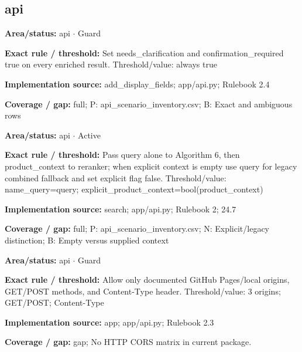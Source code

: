 \subsection*{api}
\begin{tcolorbox}[enhanced,breakable,colback=white,colframe=Muted!45,boxrule=0.45pt,arc=1.5pt,left=6pt,right=6pt,top=5pt,bottom=5pt,title={\texttt{API-CONFIRM-08}},title after break={\texttt{API-CONFIRM-08}\ (continued)},fonttitle=\headingfont\bfseries\color{Navy},coltitle=Navy]
\textbf{Area/status:} api $\boldsymbol{\cdot}$ Guard\par
\smallskip
\textbf{Exact rule / threshold:} Set needs\_\allowbreak{}clarification and confirmation\_\allowbreak{}required true on every enriched result. Threshold/\allowbreak{}value: always true\par
\smallskip
\textbf{Implementation source:} add\_\allowbreak{}display\_\allowbreak{}fields; app/\allowbreak{}api.py; Rulebook 2.4\par
\smallskip
\textbf{Coverage / gap:} full; P: api\_\allowbreak{}scenario\_\allowbreak{}inventory.csv; B: Exact and ambiguous rows
\end{tcolorbox}
\begin{tcolorbox}[enhanced,breakable,colback=white,colframe=Muted!45,boxrule=0.45pt,arc=1.5pt,left=6pt,right=6pt,top=5pt,bottom=5pt,title={\texttt{API-CONTEXT-BOUNDARY-03}},title after break={\texttt{API-CONTEXT-BOUNDARY-03}\ (continued)},fonttitle=\headingfont\bfseries\color{Navy},coltitle=Navy]
\textbf{Area/status:} api $\boldsymbol{\cdot}$ Active\par
\smallskip
\textbf{Exact rule / threshold:} Pass query alone to Algorithm 6, then product\_\allowbreak{}context to reranker; when explicit context is empty use query for legacy combined fallback and set explicit flag false. Threshold/\allowbreak{}value: name\_\allowbreak{}query=query; explicit\_\allowbreak{}product\_\allowbreak{}context=bool(product\_\allowbreak{}context)\par
\smallskip
\textbf{Implementation source:} search; app/\allowbreak{}api.py; Rulebook 2; 24.7\par
\smallskip
\textbf{Coverage / gap:} full; P: api\_\allowbreak{}scenario\_\allowbreak{}inventory.csv; N: Explicit/\allowbreak{}legacy distinction; B: Empty versus supplied context
\end{tcolorbox}
\begin{tcolorbox}[enhanced,breakable,colback=white,colframe=Muted!45,boxrule=0.45pt,arc=1.5pt,left=6pt,right=6pt,top=5pt,bottom=5pt,title={\texttt{API-CORS-09}},title after break={\texttt{API-CORS-09}\ (continued)},fonttitle=\headingfont\bfseries\color{Navy},coltitle=Navy]
\textbf{Area/status:} api $\boldsymbol{\cdot}$ Guard\par
\smallskip
\textbf{Exact rule / threshold:} Allow only documented GitHub Pages/\allowbreak{}local origins, GET/\allowbreak{}POST methods, and Content-Type header. Threshold/\allowbreak{}value: 3 origins; GET/\allowbreak{}POST; Content-Type\par
\smallskip
\textbf{Implementation source:} app; app/\allowbreak{}api.py; Rulebook 2.3\par
\smallskip
\textbf{Coverage / gap:} gap; No HTTP CORS matrix in current package.
\end{tcolorbox}
